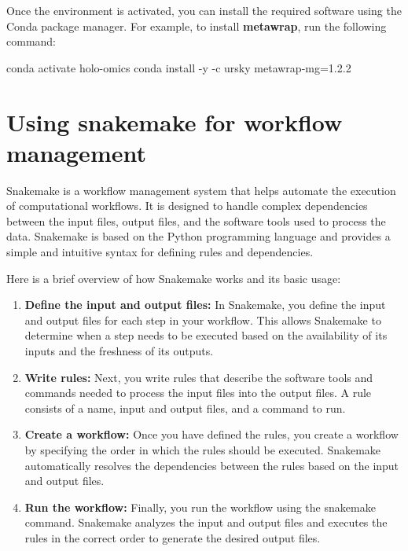 \documentclass[
]{book}
\newenvironment{Shaded}{\begin{snugshade}}{\end{snugshade}}
\newcommand{\AttributeTok}[1]{\textcolor[rgb]{0.13,0.29,0.53}{#1}}
\newcommand{\ExtensionTok}[1]{#1}
\newcommand{\NormalTok}[1]{#1}
\providecommand{\tightlist}{%
  \setlength{\itemsep}{0pt}\setlength{\parskip}{0pt}}
\begin{document}
Once the environment is activated, you can install the required software using the Conda package manager. For example, to install \textbf{metawrap}, run the following command:

\small

\begin{Shaded}
\begin{Highlighting}[]
\ExtensionTok{conda}\NormalTok{ activate holo{-}omics}
\ExtensionTok{conda}\NormalTok{ install }\AttributeTok{{-}y} \AttributeTok{{-}c}\NormalTok{ ursky metawrap{-}mg=1.2.2}
\end{Highlighting}
\end{Shaded}

\normalsize

\hypertarget{using-snakemake}{%
\section{Using snakemake for workflow management}\label{using-snakemake}}

Snakemake is a workflow management system that helps automate the execution of computational workflows. It is designed to handle complex dependencies between the input files, output files, and the software tools used to process the data. Snakemake is based on the Python programming language and provides a simple and intuitive syntax for defining rules and dependencies.

Here is a brief overview of how Snakemake works and its basic usage:

\begin{enumerate}
\def\labelenumi{\arabic{enumi}.}
\tightlist
\item
  \textbf{Define the input and output files:} In Snakemake, you define the input and output files for each step in your workflow. This allows Snakemake to determine when a step needs to be executed based on the availability of its inputs and the freshness of its outputs.
\item
  \textbf{Write rules:} Next, you write rules that describe the software tools and commands needed to process the input files into the output files. A rule consists of a name, input and output files, and a command to run.
\item
  \textbf{Create a workflow:} Once you have defined the rules, you create a workflow by specifying the order in which the rules should be executed. Snakemake automatically resolves the dependencies between the rules based on the input and output files.
\item
  \textbf{Run the workflow:} Finally, you run the workflow using the snakemake command. Snakemake analyzes the input and output files and executes the rules in the correct order to generate the desired output files.
\end{enumerate}
\end{document}
